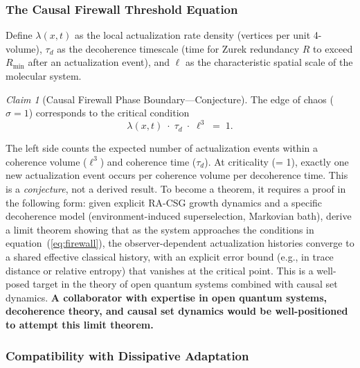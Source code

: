 \documentclass[11pt,a4paper]{article}
\theoremstyle{plain}
\theoremstyle{definition}
\theoremstyle{remark}
\newtheorem{claim}[theorem]{Claim}
\begin{document}
\subsubsection{The Causal Firewall Threshold Equation}

Define $\lambda(x,t)$ as the local actualization rate density (vertices per unit
4-volume), $\tau_{d}$ as the decoherence timescale (time for Zurek redundancy $R$
to exceed $R_{\min}$ after an actualization event), and $\ell$ as the
characteristic spatial scale of the molecular system.

\begin{claim}[Causal Firewall Phase Boundary---Conjecture]
The edge of chaos ($\sigma = 1$) corresponds to the critical condition
\begin{equation}
  \lambda(x,t)\;\cdot\;\tau_{d}\;\cdot\;\ell^{3}
  \;=\; 1.
  \label{eq:firewall}
\end{equation}
\end{claim}

The left side counts the expected number of actualization events within a coherence
volume ($\ell^{3}$) and coherence time ($\tau_{d}$). At criticality (= 1), exactly
one new actualization event occurs per coherence volume per decoherence time. This
is a \emph{conjecture}, not a derived result. To become a theorem, it requires a
proof in the following form: given explicit RA-CSG growth dynamics and a specific
decoherence model (environment-induced superselection, Markovian bath), derive a
limit theorem showing that as the system approaches the conditions in
equation~(\ref{eq:firewall}), the observer-dependent actualization histories
converge to a shared effective classical history, with an explicit error bound
(e.g., in trace distance or relative entropy) that vanishes at the critical point.
This is a well-posed target in the theory of open quantum systems combined with
causal set dynamics. \textbf{A collaborator with expertise in open quantum systems,
decoherence theory, and causal set dynamics would be well-positioned to attempt
this limit theorem.}

\subsubsection{Compatibility with Dissipative Adaptation}
\end{document}
